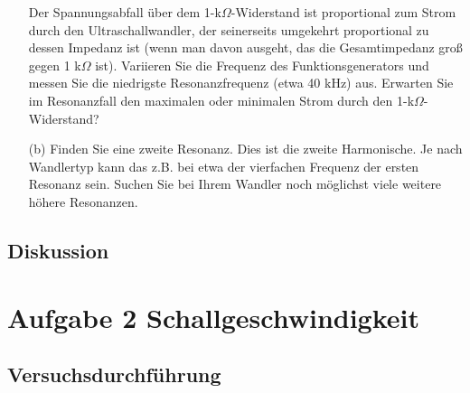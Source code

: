\documentclass[12pt]{scrartcl}
\begin{document}
\begin{itemize}
\begin{figure}[htbp]
  \label{fig:impedanz}
\end{figure}
Der Spannungsabfall über dem 1-k$\Omega$-Widerstand ist proportional zum Strom durch den Ultraschallwandler, der seinerseits umgekehrt proportional zu dessen Impedanz ist (wenn man davon ausgeht, das die Gesamtimpedanz groß gegen 1 k$\Omega$ ist).
Variieren Sie die Frequenz des Funktionsgenerators und messen Sie die niedrigste Resonanzfrequenz (etwa 40 kHz)
aus. Erwarten Sie im Resonanzfall den maximalen oder minimalen Strom durch den 1-k$\Omega$-Widerstand? 
\item[(b)]
Finden Sie eine zweite Resonanz. Dies ist die zweite Harmonische. Je nach Wandlertyp kann das z.B. bei etwa der vierfachen Frequenz der ersten Resonanz sein. Suchen Sie bei Ihrem Wandler noch möglichst viele weitere höhere
Resonanzen.
\end{itemize}
\subsection{Diskussion}
\section{Aufgabe 2 Schallgeschwindigkeit}
\subsection{Versuchsdurchführung}
\end{document}
